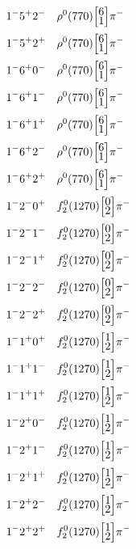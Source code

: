 \documentclass[10pt,a4paper]{article}
\def\dst{\displaystyle}
\def\vsp{\hbox{\vrule height12.5pt depth3.5pt width0pt}}
\def\ells#1#2{\Big[\hskip-5pt\vsp\begin{array}{c}\dst#1\\[-4pt]\dst#2\end{array}\vsp\hskip-5pt\Big]}
\begin{document}
\begin{align*} 
 \begin{aligned}
1^{-}5^{+}2^{-}\quad & \rho^0(770)\ells{6}{1}\pi^-\\
1^{-}5^{+}2^{+}\quad & \rho^0(770)\ells{6}{1}\pi^-\\
1^{-}6^{+}0^{-}\quad & \rho^0(770)\ells{6}{1}\pi^-\\
1^{-}6^{+}1^{-}\quad & \rho^0(770)\ells{6}{1}\pi^-\\
1^{-}6^{+}1^{+}\quad & \rho^0(770)\ells{6}{1}\pi^-\\
1^{-}6^{+}2^{-}\quad & \rho^0(770)\ells{6}{1}\pi^-\\
1^{-}6^{+}2^{+}\quad & \rho^0(770)\ells{6}{1}\pi^-\\
1^{-}2^{-}0^{+}\quad & f_2^0(1270)\ells{0}{2}\pi^-\\
1^{-}2^{-}1^{-}\quad & f_2^0(1270)\ells{0}{2}\pi^-\\
1^{-}2^{-}1^{+}\quad & f_2^0(1270)\ells{0}{2}\pi^-\\
1^{-}2^{-}2^{-}\quad & f_2^0(1270)\ells{0}{2}\pi^-\\
1^{-}2^{-}2^{+}\quad & f_2^0(1270)\ells{0}{2}\pi^-\\
1^{-}1^{+}0^{+}\quad & f_2^0(1270)\ells{1}{2}\pi^-\\
1^{-}1^{+}1^{-}\quad & f_2^0(1270)\ells{1}{2}\pi^-\\
1^{-}1^{+}1^{+}\quad & f_2^0(1270)\ells{1}{2}\pi^-\\
1^{-}2^{+}0^{-}\quad & f_2^0(1270)\ells{1}{2}\pi^-\\
1^{-}2^{+}1^{-}\quad & f_2^0(1270)\ells{1}{2}\pi^-\\
1^{-}2^{+}1^{+}\quad & f_2^0(1270)\ells{1}{2}\pi^-\\
1^{-}2^{+}2^{-}\quad & f_2^0(1270)\ells{1}{2}\pi^-\\
1^{-}2^{+}2^{+}\quad & f_2^0(1270)\ells{1}{2}\pi^-\\
\end{aligned} 
 \end{align*}\pagebreak
\end{document}
